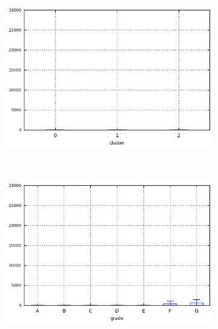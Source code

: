 \begin{anexosenv}
\begin{figure}[t!]
\begin{subfigure}[t]{0.45\textwidth}
            \centerline{\includegraphics[width=1.05\textwidth]{img/recoveries_by_cluster}}
        \end{subfigure}%
        ~ 
        \begin{subfigure}[t]{0.45\textwidth}
            \centering
   
            \centerline{\includegraphics[width=1.05\textwidth]{img/recoveries_by_grade}}

        \end{subfigure}
\end{figure}


\begin{figure}[t!]
    \centering
        \caption{\emph{Boxplots} de open\textunderscore acc }
        \begin{subfigure}[t]{0.45\textwidth}
            \centering


\end{subfigure}
\end{figure}
\end{anexosenv}
